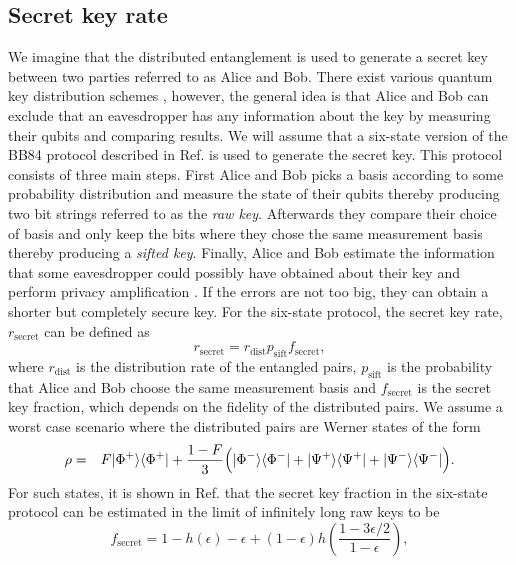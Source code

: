 \subsection{Secret key rate} \label{sec:secret}
We imagine that the distributed entanglement is used to generate a secret key
between two parties referred to as Alice and Bob. There exist various quantum
key distribution schemes \cite{scarani,bennett2,ekert,bruss}, however, the
general idea is that Alice and Bob can exclude that an eavesdropper has any
information about the key by measuring their qubits and comparing results. We
will assume that a six-state version of the BB84 protocol described in Ref.
\cite{bruss} is used to generate the secret key. This protocol consists of three
main steps. First Alice and Bob picks a basis according to some probability
distribution and measure the state of their qubits thereby producing two bit
strings referred to as the \emph{raw key}. Afterwards they compare their choice
of basis and only keep the bits where they chose the same measurement basis
thereby producing a \emph{sifted key}. Finally, Alice and Bob estimate the
information that some eavesdropper could possibly have obtained about their key
and perform privacy amplification \cite{scarani}. If the errors are not too big,
they can obtain a shorter but completely secure key.  For the six-state
protocol, the secret key rate, $r_{\text{secret}}$ can be defined as
\begin{equation}
r_{\text{secret}}=r_{\text{dist}}p_{\text{sift}}f_{\text{secret}},
\end{equation}
where $r_{\text{dist}}$ is the distribution rate of the entangled pairs,
$p_{\text{sift}}$ is the probability that Alice and Bob choose the same
measurement basis and $f_{\text{secret}}$ is the secret key fraction, which
depends on the fidelity of the distributed pairs. We assume a worst case
scenario where the distributed pairs are Werner states of the form
\begin{eqnarray}
\rho&=&F| \Phi^{+} \rangle\langle \Phi^{+} | +
\frac{1-F}{3}\Big(| \Phi^{-} \rangle\langle \Phi^{-} |
+| \Psi^{+} \rangle\langle \Psi^{+} |+| \Psi^{-} \rangle\langle \Psi^{-} |\Big).
\end{eqnarray}
For such states, it is shown in Ref. \cite{scarani} that the secret key fraction
in the six-state protocol can be estimated in the limit of infinitely long raw
keys to be
\begin{equation} \label{eq:secret2}
f_{\text{secret}}=1-h(\epsilon)-\epsilon+(1-\epsilon)
h\left(\frac{1-3\epsilon/2}{1-\epsilon}\right),
\end{equation} 
